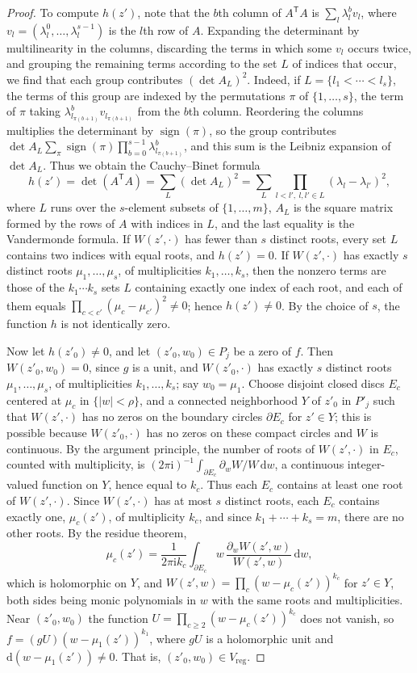 \begin{proof}
To compute $h(z')$, note that the $b$th column of $A^{\mathsf T}A$ is $\sum_l\lambda_l^bv_l$, where $v_l=(\lambda_l^0,\ldots,\lambda_l^{s-1})$ is the $l$th row of $A$. Expanding the determinant by multilinearity in the columns, discarding the terms in which some $v_l$ occurs twice, and grouping the remaining terms according to the set $L$ of indices that occur, we find that each group contributes $(\det A_L)^2$. Indeed, if $L=\{l_1<\cdots<l_s\}$, the terms of this group are indexed by the permutations $\pi$ of $\{1,\ldots,s\}$, the term of $\pi$ taking $\lambda_{l_{\pi(b+1)}}^bv_{l_{\pi(b+1)}}$ from the $b$th column. Reordering the columns multiplies the determinant by $\operatorname{sign}(\pi)$, so the group contributes $\det A_L\sum_\pi\operatorname{sign}(\pi)\prod_{b=0}^{s-1}\lambda_{l_{\pi(b+1)}}^b$, and this sum is the Leibniz expansion of $\det A_L$. Thus we obtain the Cauchy--Binet formula
\[
 h(z')=\det(A^{\mathsf T}A)=\sum_L(\det A_L)^2=\sum_L\prod_{l<l',\ l,l'\in L}(\lambda_l-\lambda_{l'})^2,
\]
where $L$ runs over the $s$-element subsets of $\{1,\ldots,m\}$, $A_L$ is the square matrix formed by the rows of $A$ with indices in $L$, and the last equality is the Vandermonde formula. If $W(z',\cdot)$ has fewer than $s$ distinct roots, every set $L$ contains two indices with equal roots, and $h(z')=0$. If $W(z',\cdot)$ has exactly $s$ distinct roots $\mu_1,\ldots,\mu_s$, of multiplicities $k_1,\ldots,k_s$, then the nonzero terms are those of the $k_1\cdots k_s$ sets $L$ containing exactly one index of each root, and each of them equals $\prod_{c<c'}(\mu_c-\mu_{c'})^2\neq0$; hence $h(z')\neq0$. By the choice of $s$, the function $h$ is not identically zero.

Now let $h(z'_0)\neq0$, and let $(z'_0,w_0)\in P_j$ be a zero of $f$. Then $W(z'_0,w_0)=0$, since $g$ is a unit, and $W(z'_0,\cdot)$ has exactly $s$ distinct roots $\mu_1,\ldots,\mu_s$, of multiplicities $k_1,\ldots,k_s$; say $w_0=\mu_1$. Choose disjoint closed discs $E_c$ centered at $\mu_c$ in $\{|w|<\rho\}$, and a connected neighborhood $Y$ of $z'_0$ in $P'_j$ such that $W(z',\cdot)$ has no zeros on the boundary circles $\partial E_c$ for $z'\in Y$; this is possible because $W(z'_0,\cdot)$ has no zeros on these compact circles and $W$ is continuous. By the argument principle, the number of roots of $W(z',\cdot)$ in $E_c$, counted with multiplicity, is $(2\pi\mathrm i)^{-1}\int_{\partial E_c}\partial_wW/W\,\mathrm dw$, a continuous integer-valued function on $Y$, hence equal to $k_c$. Thus each $E_c$ contains at least one root of $W(z',\cdot)$. Since $W(z',\cdot)$ has at most $s$ distinct roots, each $E_c$ contains exactly one, $\mu_c(z')$, of multiplicity $k_c$, and since $k_1+\cdots+k_s=m$, there are no other roots. By the residue theorem,
\[
 \mu_c(z')=\frac1{2\pi\mathrm ik_c}\int_{\partial E_c}w\,\frac{\partial_wW(z',w)}{W(z',w)}\,\mathrm dw,
\]
which is holomorphic on $Y$, and $W(z',w)=\prod_c(w-\mu_c(z'))^{k_c}$ for $z'\in Y$, both sides being monic polynomials in $w$ with the same roots and multiplicities. Near $(z'_0,w_0)$ the function $U=\prod_{c\geq2}(w-\mu_c(z'))^{k_c}$ does not vanish, so $f=(gU)(w-\mu_1(z'))^{k_1}$, where $gU$ is a holomorphic unit and $\mathrm d(w-\mu_1(z'))\neq0$. That is, $(z'_0,w_0)\in V_{\mathrm{reg}}$.
\end{proof}
